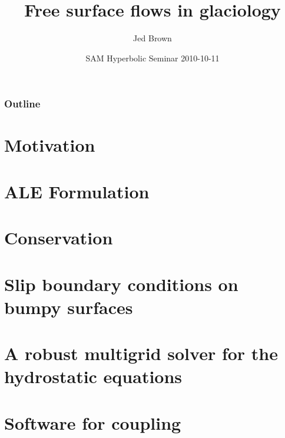 \documentclass{beamer}
\title{Free surface flows in glaciology}
\author{Jed Brown}
\institute[ETH Z\"urich]
{
  Laboratory of Hydrology, Hydraulics, and Glaciology \\
  ETH Z\"urich
}
\date[2010-10-11]{SAM Hyperbolic Seminar 2010-10-11}
\begin{document}
\lstset{language=C}
\normalem

\begin{frame}
\titlepage
\end{frame}

\begin{frame}
  \frametitle{Outline}
  \tableofcontents
\end{frame}

\section{Motivation}







\section{ALE Formulation}

%



\section{Conservation}


\section[Slip]{Slip boundary conditions on bumpy surfaces}


\section[Hydrostatic]{A robust multigrid solver for the hydrostatic equations}




\section{Software for coupling}

\end{document}
